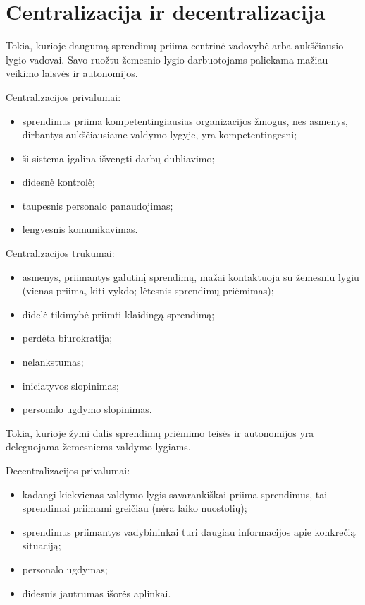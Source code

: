 \section{Centralizacija ir decentralizacija}

\begin{defn}
  Tokia, kurioje daugumą sprendimų priima centrinė vadovybė arba
  aukščiausio lygio vadovai. Savo ruožtu žemesnio lygio darbuotojams
  paliekama mažiau veikimo laisvės ir autonomijos.
\end{defn}

Centralizacijos privalumai:
\begin{itemize}
  \item sprendimus priima kompetentingiausias organizacijos žmogus, nes
    asmenys, dirbantys aukščiausiame valdymo lygyje, yra kompetentingesni;
  \item ši sistema įgalina išvengti darbų dubliavimo;
  \item didesnė kontrolė;
  \item taupesnis personalo panaudojimas;
  \item lengvesnis komunikavimas.
\end{itemize}

Centralizacijos trūkumai:
\begin{itemize}
  \item asmenys, priimantys galutinį sprendimą, mažai kontaktuoja su
    žemesniu lygiu (vienas priima, kiti vykdo; lėtesnis sprendimų
    priėmimas);
  \item didelė tikimybė priimti klaidingą sprendimą;
  \item perdėta biurokratija;
  \item nelankstumas;
  \item iniciatyvos slopinimas;
  \item personalo ugdymo slopinimas.
\end{itemize}

\begin{defn}
  Tokia, kurioje žymi dalis sprendimų priėmimo teisės ir autonomijos
  yra deleguojama žemesniems valdymo lygiams.
\end{defn}

Decentralizacijos privalumai:
\begin{itemize}
  \item kadangi kiekvienas valdymo lygis savarankiškai priima sprendimus,
    tai sprendimai priimami greičiau (nėra laiko nuostolių);
  \item sprendimus priimantys vadybininkai turi daugiau informacijos
    apie konkrečią situaciją;
  \item personalo ugdymas;
  \item didesnis jautrumas išorės aplinkai.
\end{itemize}

